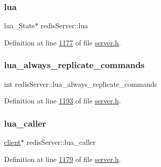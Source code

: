 \subsubsection{\texorpdfstring{lua}{lua}}
{\footnotesize\ttfamily lua\+\_\+\+State$\ast$ redis\+Server\+::lua}



Definition at line \hyperlink{server_8h_source_l01177}{1177} of file \hyperlink{server_8h_source}{server.\+h}.

\mbox{\label{structredisServer_ace635eab6cd0426c1d806fcbe56bdd35}} 
\subsubsection{\texorpdfstring{lua\+\_\+always\+\_\+replicate\+\_\+commands}{lua\_always\_replicate\_commands}}
{\footnotesize\ttfamily int redis\+Server\+::lua\+\_\+always\+\_\+replicate\+\_\+commands}



Definition at line \hyperlink{server_8h_source_l01193}{1193} of file \hyperlink{server_8h_source}{server.\+h}.

\mbox{\label{structredisServer_a20065084df930ec17254ddb6460d9274}} 
\subsubsection{\texorpdfstring{lua\+\_\+caller}{lua\_caller}}
{\footnotesize\ttfamily \hyperlink{structclient}{client}$\ast$ redis\+Server\+::lua\+\_\+caller}



Definition at line \hyperlink{server_8h_source_l01179}{1179} of file \hyperlink{server_8h_source}{server.\+h}.

\mbox{\label{structredisServer_ae861a5eec36ed055a0fa245afc0f52c9}} 
